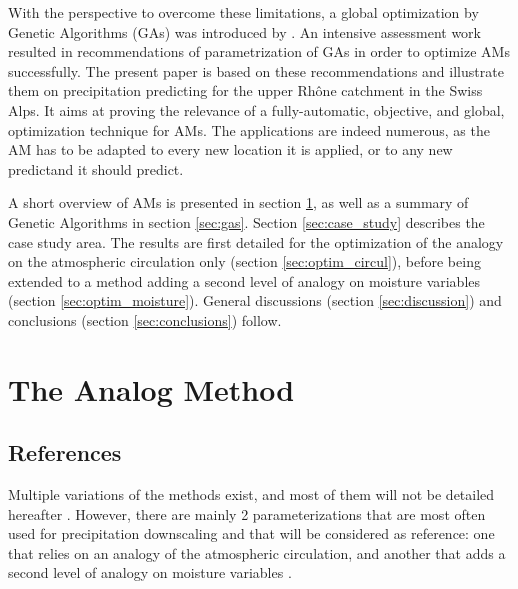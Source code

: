 \documentclass[review]{elsarticle}
\begin{document}
With the perspective to overcome these limitations, a global optimization by Genetic Algorithms (GAs) was introduced by \citet{Horton2016a}. An intensive assessment work resulted in recommendations of parametrization of GAs in order to optimize AMs successfully. The present paper is based on these recommendations and illustrate them on precipitation predicting for the upper Rh\^{o}ne catchment in the Swiss Alps. It aims at proving the relevance of a fully-automatic, objective, and global, optimization technique for AMs. The applications are indeed numerous, as the AM has to be adapted to every new location it is applied, or to any new predictand it should predict.

A short overview of AMs is presented in section \ref{sec:analog_method}, as well as a summary of Genetic Algorithms in section \ref{sec:gas}. Section \ref{sec:case_study} describes the case study area. The results are first detailed for the optimization of the analogy on the atmospheric circulation only (section \ref{sec:optim_circul}), before being extended to a method adding a second level of analogy on moisture variables (section \ref{sec:optim_moisture}). General discussions (section \ref{sec:discussion}) and conclusions (section \ref{sec:conclusions}) follow.


\section{The Analog Method}
\label{sec:analog_method}

\subsection{References}
\label{sec:references}

Multiple variations of the methods exist, and most of them will not be detailed hereafter \cite[see][for more comprehensive listings]{Horton2016, BenDaoud2015}. However, there are mainly 2 parameterizations that are most often used for precipitation downscaling and that will be considered as reference: one that relies on an analogy of the atmospheric circulation, and another that adds a second level of analogy on moisture variables \citep{Obled2002, Bontron2005, Marty2012}.
\end{document}
